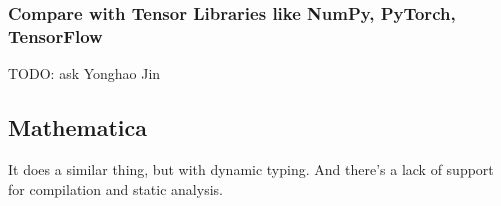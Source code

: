 \documentclass{article}
\begin{document}
\subsubsection{Compare with Tensor Libraries like NumPy, PyTorch, TensorFlow}
TODO: ask Yonghao Jin

\subsection{Mathematica}
It does a similar thing, but with dynamic typing. And there's a lack of support for compilation and static analysis.


\end{document}
